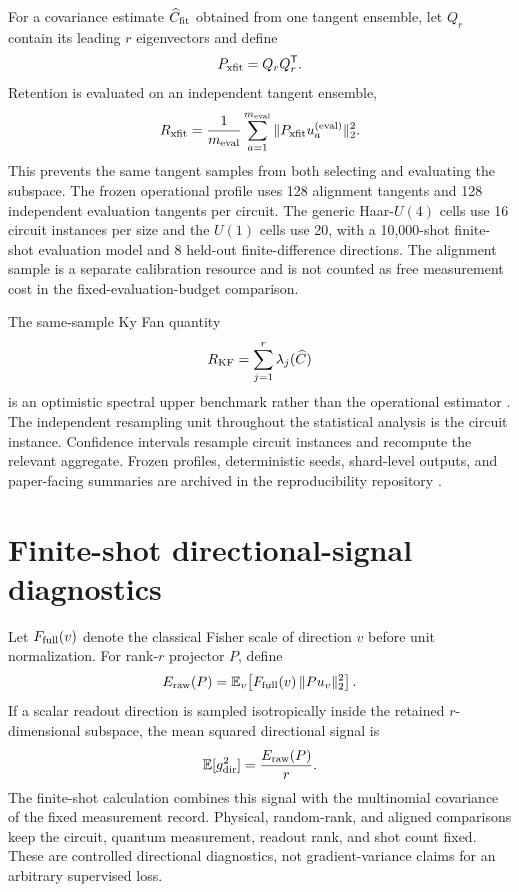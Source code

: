 \documentclass[11pt]{article}
\begin{document}
For a covariance estimate $\widehat C_{\rm fit}$ obtained from one tangent ensemble, let $Q_r$ contain its leading $r$ eigenvectors and define
\begin{equation}
P_{\rm xfit}=Q_rQ_r^{\mathsf T}.
\end{equation}
Retention is evaluated on an independent tangent ensemble,
\begin{equation}
 R_{\rm xfit}=\frac1{m_{\rm eval}}\sum_{a=1}^{m_{\rm eval}}
\|P_{\rm xfit}u_a^{\rm(eval)}\|_2^2.
\label{eq:si-crossfit}
\end{equation}
This prevents the same tangent samples from both selecting and evaluating the subspace. The frozen operational profile uses 128 alignment tangents and 128 independent evaluation tangents per circuit. The generic Haar-$U(4)$ cells use 16 circuit instances per size and the $U(1)$ cells use 20, with a 10,000-shot finite-shot evaluation model and 8 held-out finite-difference directions. The alignment sample is a separate calibration resource and is not counted as free measurement cost in the fixed-evaluation-budget comparison.

The same-sample Ky Fan quantity
\begin{equation}
R_{\rm KF}=\sum_{j=1}^r\lambda_j(\widehat C)
\end{equation}
is an optimistic spectral upper benchmark rather than the operational estimator \cite{KyFan1949}. The independent resampling unit throughout the statistical analysis is the circuit instance. Confidence intervals resample circuit instances and recompute the relevant aggregate. Frozen profiles, deterministic seeds, shard-level outputs, and paper-facing summaries are archived in the reproducibility repository \cite{AitHaddou2026MeasurementAccessible}.

\section{Finite-shot directional-signal diagnostics}

Let $F_{\rm full}(v)$ denote the classical Fisher scale of direction $v$ before unit normalization. For rank-$r$ projector $P$, define
\begin{equation}
E_{\rm raw}(P)=\mathbb E_v\!\left[F_{\rm full}(v)\,\|Pu_v\|_2^2\right].
\label{eq:si-raw-energy}
\end{equation}
If a scalar readout direction is sampled isotropically inside the retained $r$-dimensional subspace, the mean squared directional signal is
\begin{equation}
\mathbb E[g_{\rm dir}^2]=\frac{E_{\rm raw}(P)}{r}.
\label{eq:si-dir-signal}
\end{equation}
The finite-shot calculation combines this signal with the multinomial covariance of the fixed measurement record. Physical, random-rank, and aligned comparisons keep the circuit, quantum measurement, readout rank, and shot count fixed. These are controlled directional diagnostics, not gradient-variance claims for an arbitrary supervised loss.
\end{document}
